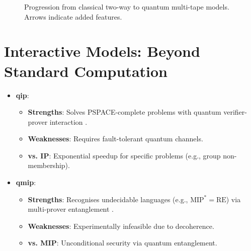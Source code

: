 \begin{figure}[ht]
\centering
{}
\caption{Progression from classical two-way to quantum multi-tape models. Arrows indicate added features.}
\label{fig:two-way-progression}
\end{figure}

\section{Interactive Models: Beyond Standard Computation}
\label{sec:interactive-comparison}

\begin{itemize}
    \item \textbf{\gls{qip}}:
    \begin{itemize}
        \item \textbf{Strengths}: Solves PSPACE-complete problems with quantum verifier-prover interaction \cite{zheng2015power}.
        \item \textbf{Weaknesses}: Requires fault-tolerant quantum channels.
        \item \textbf{vs. IP}: Exponential speedup for specific problems (e.g., group non-membership).
    \end{itemize}
    
    \item \textbf{\gls{qmip}}:
    \begin{itemize}
        \item \textbf{Strengths}: Recognises undecidable languages (e.g., \( \text{MIP}^* = \text{RE} \)) via multi-prover entanglement \cite{yamakami2014constant}.
        \item \textbf{Weaknesses}: Experimentally infeasible due to decoherence.
        \item \textbf{vs. MIP}: Unconditional security via quantum entanglement.
    \end{itemize}
\end{itemize}


